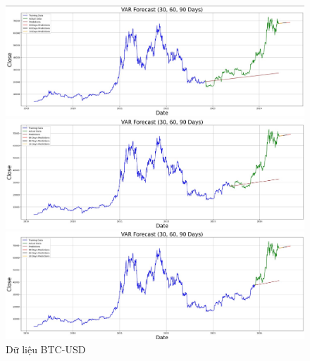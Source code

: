 \documentclass[conference]{IEEEtran}
\begin{document}
\begin{figure}[H]
    \centering
    \begin{minipage}{0.15\textwidth}
    \centering
    \includegraphics[width=1\textwidth]{Figure/VAR_BTC_7.jpg}
    \end{minipage}
    \hfill
    \begin{minipage}{0.15\textwidth}
    \centering
    \includegraphics[width=1\textwidth]{Figure/VAR_BTC_8.jpg}
    \end{minipage}
    \hfill
    \begin{minipage}{0.15\textwidth}
    \centering
    \includegraphics[width=1\textwidth]{Figure/VAR_BTC_9.jpg}
    \end{minipage}
    \caption{Dữ liệu BTC-USD}
    \label{fig:1}
\end{figure}
\end{document}
